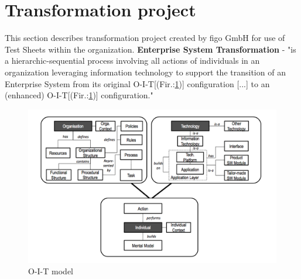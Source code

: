 


\section{Transformation project}
This section describes transformation project created by figo GmbH for use of Test Sheets within the organization.
\textbf{Enterprise System Transformation} -  "is a hierarchic-sequential process involving all actions of individuals in an organization leveraging information technology to support the transition of an Enterprise System from its original O-I-T[(Fir.:\ref{fig:oit})] configuration [...] to an (enhanced) O-I-T[(Fir.:\ref{fig:oit})] configuration."\cite{MES5}

\begin{figure}[ht]
	\label{fig:oit}
	\centering
	\includegraphics[width=\textwidth]{grafiken/oit.png}
	\caption{O-I-T model\cite{MES5}}
\end{figure}


